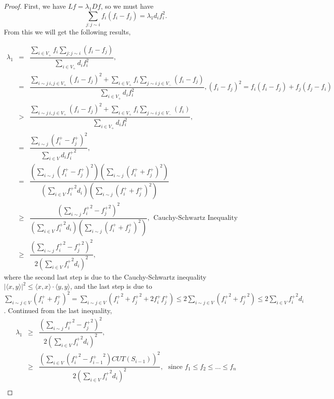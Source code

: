 \documentclass[twoside]{article}
\theoremstyle{definition}
\theoremstyle{definition}
\theoremstyle{remark}
\begin{document}
\begin{proof}
First, we have $Lf= \lambda_1 D f$, so we must have
\begin{equation}
\sum_{j:j\sim i} f_i(f_i-f_j) = \lambda_1 d_i f_i^2.
\end{equation}
From this we will get the following results,

\begin{eqnarray*}
\lambda_1 & = & \dfrac{\sum_{i\in V_{+}}f_i\sum_{j:j\sim i}(f_i-f_j)}{\sum_{i \in V_{+}}d_if_i^2},  \\
& = & \dfrac{\sum_{i\sim j ~ i,j\in V_{+}}(f_i-f_j)^2 + \sum_{i\in V_{+}}f_i\sum_{j\sim i ~ j\in V_{-}}(f_i-f_j)}{\sum_{i \in V_{+}}d_if_i^2}, (f_i-f_j)^2=f_i (f_i - f_j)+f_j(f_j-f_i)\\
& > & \dfrac{\sum_{i\sim j ~ i,j\in V_{+}}(f_i-f_j)^2 + \sum_{i\in V_{+}}f_i\sum_{j\sim i ~ j\in V_{-}}(f_i)}{\sum_{i\in V_{+}}d_if_i^2},\\
& = & \dfrac{\sum_{i\sim j}(f^{+}_i-f^{+}_j)^2 }{\sum_{i\in V}d_i{f^{+}_i}^2},\\
& = & \dfrac{(\sum_{i\sim j}(f^+_i-f^+_j)^2)(\sum_{i\sim j}(f^+_i +f^+_j)^2)}{(\sum_{i\in V}{f^+_i}^2d_i)(\sum_{i\sim j}(f^+_i+f^+_j)^2)} \\
& \ge & \dfrac{(\sum_{i\sim j}{f^+_i}^2-{f^+_j}^2)^2}{(\sum_{i\in V}{f^+_i}^2d_i)(\sum_{i\sim j}(f^+_i+f^+_j)^2)}, \ \ \textrm{Cauchy-Schwartz Inequality} \\
& \ge & \dfrac{(\sum_{i\sim j}{f^+_i}^2-{f^+_j}^2)^2}{2(\sum_{i\in V}{f^+_i}^2d_i)^2},
\end{eqnarray*}
where the second last step is due to the Cauchy-Schwartz inequality $|\langle x,y\rangle|^2 \leq \langle x,x\rangle\cdot \langle y,y\rangle $, and the last step is due to  $\sum_{i\sim j\in V} (f_i^+ + f^+_j)^2 =\sum_{i\sim j\in V} ({f^+_i}^2 + {f^+_j}^2 + 2 f^+_i f^+_j )\leq 2 \sum_{i\sim j\in V} ({f^+_i}^2  + {f^+_j}^2) \leq 2 \sum_{i\in V} {f^+_i}^2 d_i$.
Continued from the last inequality,
 \begin{eqnarray*}
\lambda_1 & \ge & \dfrac{(\sum_{i\sim j}{f^+_i}^2-{f^+_j}^2)^2}{2(\sum_{i\in V}{f^+_i}^2d_i)^2},  \\
& \ge & \dfrac{(\sum_{i\in V}({f^+_i}^2-{f^+_{i-1}}^2) CUT(S_{i-1}))^2}{2(\sum_{i\in V}{f^+_i}^2d_i)^2}, \ \ \ \mbox{since $f_1 \leq f_{2} \leq \ldots \leq f_n$}\\

\end{eqnarray*}
\end{proof}
\end{document}
